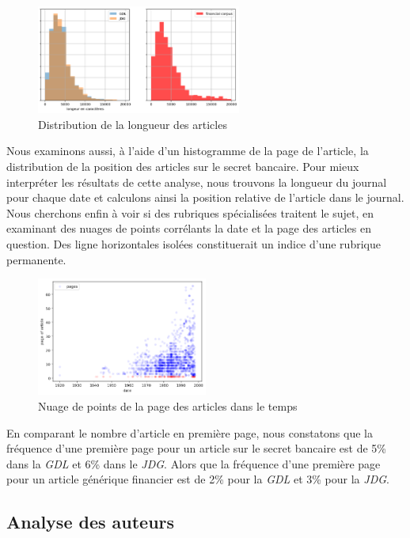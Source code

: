\documentclass[11pt]{article}
\begin{document}
\begin{figure}
\centering
\includegraphics[width=0.6\textwidth ]{methodology/article_lengths.png}
\caption{Distribution de la longueur des articles}
\end{figure}

Nous examinons aussi, à l'aide d'un histogramme de la page de l'article,
la distribution de la position des articles sur le secret bancaire. Pour
mieux interpréter les résultats de cette analyse, nous trouvons la
longueur du journal pour chaque date et calculons ainsi la position
relative de l'article dans le journal. Nous cherchons enfin à voir si
des rubriques spécialisées traitent le sujet, en examinant des nuages de
points corrélants la date et la page des articles en question. Des ligne
horizontales isolées constituerait un indice d'une rubrique permanente.

\begin{figure}
\centering
\includegraphics[width=0.5\textwidth ]{methodology/scatter.png}
\caption{Nuage de points de la page des articles dans le temps}
\end{figure}

En comparant le nombre d'article en première page, nous constatons que
la fréquence d'une première page pour un article sur le secret bancaire
est de 5\% dans la \emph{GDL} et 6\% dans le \emph{JDG}. Alors que la
fréquence d'une première page pour un article générique financier est de
2\% pour la \emph{GDL} et 3\% pour la \emph{JDG}.

\hypertarget{analyse-des-auteurs}{%
\subsection{Analyse des auteurs}\label{analyse-des-auteurs}}
\end{document}

